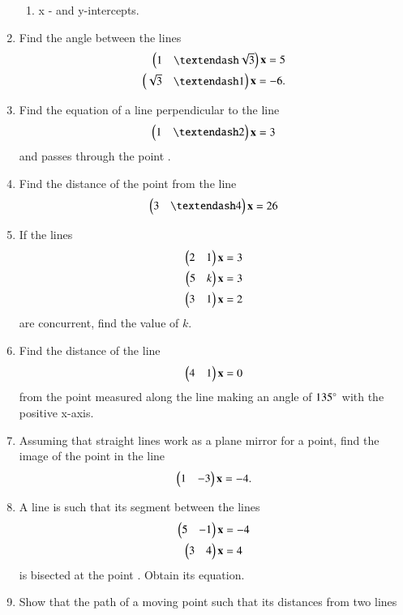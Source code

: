 \begin{enumerate}[label=\arabic*.,ref=\thesubsection.\theenumi]
\begin{enumerate}
\item  x - and y-intercepts.
\end{enumerate}
\item Find the angle between the lines 
\begin{align}
\myvec{1 & – \sqrt{3}}\vec{x}  = 5
\\
\myvec{\sqrt{3} & –1}\vec{x}  = -6
. 
\end{align}
\item Find the equation of a line perpendicular to the line 
\begin{align}
\myvec{1 & – 2}\vec{x}  = 3
\end{align}
%
and passes through the point .
\item Find the distance of the point  from the line 
\begin{align}
\myvec{3 & – 4}\vec{x}  = 26
\end{align}
\item If the lines 
\begin{align}
\begin{pmatrix}2 & 1\end{pmatrix}\mathbf{x}  = 3
\\
\begin{pmatrix}5 & k\end{pmatrix}\mathbf{x}  = 3
\\
\begin{pmatrix}3 & 1\end{pmatrix}\mathbf{x}  = 2
\end{align}
%
are concurrent, find the value of $k$.
%
\item Find the distance of the line
\begin{align}
\begin{pmatrix}4 & 1\end{pmatrix}\mathbf{x}  = 0
\end{align}
%
from the point  measured along the line making an angle of $135\degree$ with the positive x-axis.
\item Assuming that straight lines work as a plane mirror for a point, find the image of the point  in the line 
%
\begin{align}
\begin{pmatrix}1 & -3\end{pmatrix}\mathbf{x}  = -4.
\end{align}
%
\item A line is such that its segment between the lines %
\begin{align}
\begin{pmatrix}5 & -1\end{pmatrix}\mathbf{x}  &= -4
\\
\begin{pmatrix}3 & 4\end{pmatrix}\mathbf{x}  &= 4
\end{align}
%
is bisected at the point .  Obtain its equation.
%
\item Show that the path of a moving point such that its distances from two lines

\end{enumerate}
